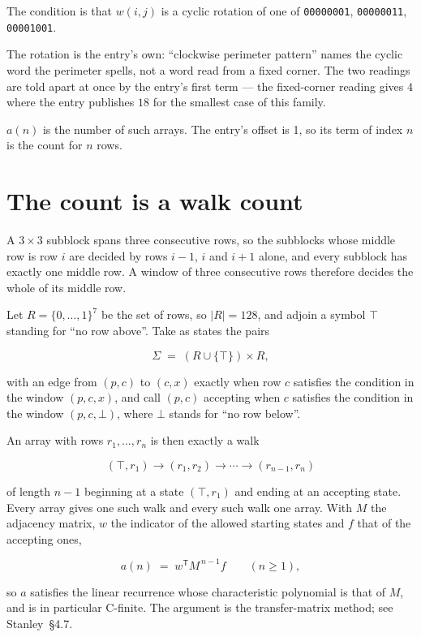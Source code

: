 \documentclass[11pt]{article}
\theoremstyle{definition}
\begin{document}
The condition is that $w(i,j)$ is a cyclic rotation of one of \texttt{00000001}, \texttt{00000011}, \texttt{00001001}.

The rotation is the entry's own: ``clockwise perimeter pattern'' names the cyclic word the perimeter spells, not a word read from a fixed corner. The two readings are told apart at once by the entry's first term --- the fixed-corner reading gives $4$ where the entry publishes $18$ for the smallest case of this family.

$a(n)$ is the number of such arrays. The entry's offset is 1, so its term of index $n$ is the count for $n$ rows.

\section{The count is a walk count}

A $3 \times 3$ subblock spans three consecutive rows, so the subblocks whose middle row is row $i$ are decided by rows $i-1$, $i$ and $i+1$ alone, and every subblock has exactly one middle row. A window of three consecutive rows therefore decides the whole of its middle row.

Let $R = \{0,\dots,1\}^{7}$ be the set of rows, so $|R| = 128$, and adjoin a symbol $\top$ standing for ``no row above''. Take as states the pairs

\[\Sigma \;=\; (R \cup \{\top\}) \times R,\]

with an edge from $(p,c)$ to $(c,x)$ exactly when row $c$ satisfies the condition in the window $(p,c,x)$, and call $(p,c)$ accepting when $c$ satisfies the condition in the window $(p,c,\bot)$, where $\bot$ stands for ``no row below''.

An array with rows $r_1,\dots,r_n$ is then exactly a walk

\[(\top,r_1) \to (r_1,r_2) \to \cdots \to (r_{n-1},r_n)\]

of length $n-1$ beginning at a state $(\top,r_1)$ and ending at an accepting state. Every array gives one such walk and every such walk one array. With $M$ the adjacency matrix, $w$ the indicator of the allowed starting states and $f$ that of the accepting ones,

\[a(n) \;=\; w^{\mathsf T} M^{\,n-1} f \qquad (n \ge 1),\]

so $a$ satisfies the linear recurrence whose characteristic polynomial is that of $M$, and is in particular C-finite. The argument is the transfer-matrix method; see Stanley~\S4.7.
\end{document}
